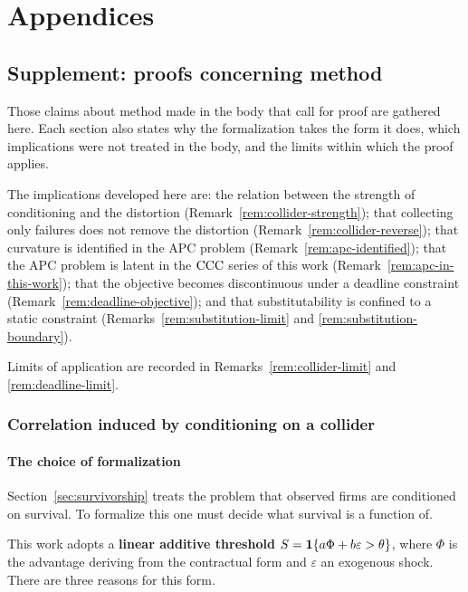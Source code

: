 \appendix
\part{Appendices}

\chapter{Supplement: proofs concerning method}
\label{app:proofs}

Those claims about method made in the body that call for proof are gathered here. Each section
also states why the formalization takes the form it does, which implications were not treated in
the body, and the limits within which the proof applies.

The implications developed here are: the relation between the strength of conditioning and the
distortion (Remark~\ref{rem:collider-strength}); that collecting only failures does not remove
the distortion (Remark~\ref{rem:collider-reverse}); that curvature is identified in the APC
problem (Remark~\ref{rem:apc-identified}); that the APC problem is latent in the $\mathrm{CCC}$ series of
this work (Remark~\ref{rem:apc-in-this-work}); that the objective becomes discontinuous under a
deadline constraint (Remark~\ref{rem:deadline-objective}); and that substitutability is confined
to a static constraint (Remarks~\ref{rem:substitution-limit} and \ref{rem:substitution-boundary}).

Limits of application are recorded in Remarks~\ref{rem:collider-limit} and
\ref{rem:deadline-limit}.

\section{Correlation induced by conditioning on a collider}

\subsection{The choice of formalization}

Section~\ref{sec:survivorship} treats the problem that observed firms are conditioned on
survival. To formalize this one must decide what survival is a function of.

This work adopts a \textbf{linear additive threshold} $S = \mathbf{1}\{a\Phi + b\varepsilon > \theta\}$,
where $\Phi$ is the advantage deriving from the contractual form and $\varepsilon$ an exogenous
shock. There are three reasons for this form.

